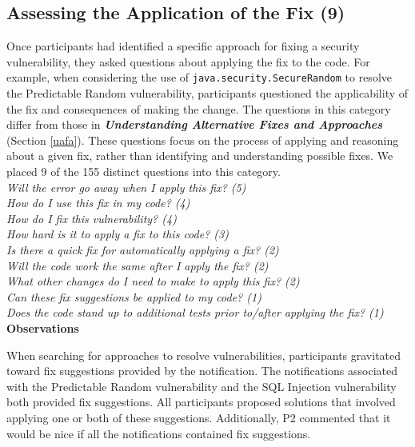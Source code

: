 \documentclass[conference]{IEEEtran}
\begin{document}

\noindent\subsection{\textbf{Assessing the Application of the Fix (9)}}\label{aaf}
Once participants had identified a specific approach for fixing a security vulnerability, they asked questions about applying the fix to the code.
For example, when considering the use of \texttt{java.security.SecureRandom} to resolve the Predictable Random vulnerability, participants questioned the applicability of the fix and consequences of making the change. 
The questions in this category differ from those in \emph{\textbf{Understanding Alternative Fixes and Approaches}} (Section \ref{uafa}). 
These questions focus on the process of applying  and reasoning about a given fix, rather than identifying and understanding possible fixes.
We placed 9 of the 155 distinct questions into this category.
\\

\noindent\emph{Will the error go away when I apply this fix? (5)} \\
\emph{How do I use this fix in my code? (4)} \\
\emph{How do I fix this vulnerability? (4)} \\
\emph{How hard is it to apply a fix to this code? (3)} \\
\emph{Is there a quick fix for automatically applying a fix? (2)} \\
\emph{Will the code work the same after I apply the fix? (2)} \\
\emph{What other changes do I need to make to apply this fix? (2)} \\
\emph{Can these fix suggestions be applied to my code? (1)} \\
\emph{Does the code stand up to additional tests prior to/after applying the fix? (1)} \\


\noindent\textbf{Observations}

When searching for approaches to resolve vulnerabilities, participants gravitated toward fix suggestions provided by the notification.
The notifications associated with the Predictable Random vulnerability and the SQL Injection vulnerability both provided fix suggestions.
All participants proposed solutions that involved applying one or both of these suggestions. 
Additionally, P2 commented that it would be nice if all the notifications contained fix suggestions.
\end{document}
